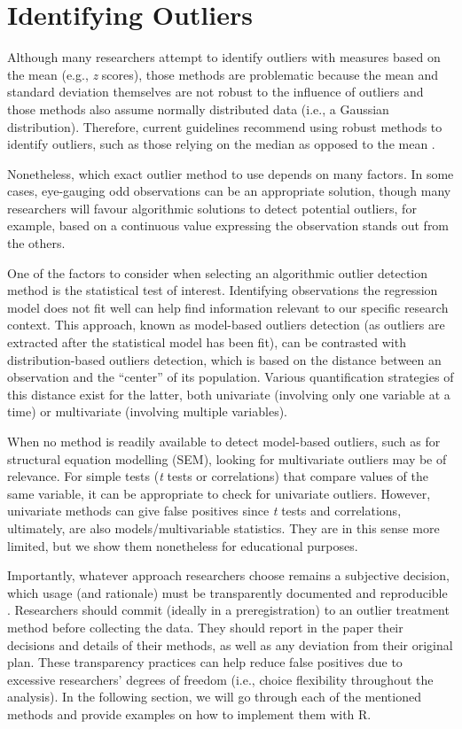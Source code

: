 \documentclass[sn-basic, lineno,pdflatex]{sn-jnl}
\begin{document}
\hypertarget{identifying-outliers}{%
\section{Identifying Outliers}\label{identifying-outliers}}

Although many researchers attempt to identify outliers with measures
based on the mean (e.g., \emph{z} scores), those methods are problematic
because the mean and standard deviation themselves are not robust to the
influence of outliers and those methods also assume normally distributed
data (i.e., a Gaussian distribution). Therefore, current guidelines
recommend using robust methods to identify outliers, such as those
relying on the median as opposed to the mean
\citep{leys2019outliers, leys2013outliers, leys2018outliers}.

Nonetheless, which exact outlier method to use depends on many factors.
In some cases, eye-gauging odd observations can be an appropriate
solution, though many researchers will favour algorithmic solutions to
detect potential outliers, for example, based on a continuous value
expressing the observation stands out from the others.

One of the factors to consider when selecting an algorithmic outlier
detection method is the statistical test of interest. Identifying
observations the regression model does not fit well can help find
information relevant to our specific research context. This approach,
known as model-based outliers detection (as outliers are extracted after
the statistical model has been fit), can be contrasted with
distribution-based outliers detection, which is based on the distance
between an observation and the ``center'' of its population. Various
quantification strategies of this distance exist for the latter, both
univariate (involving only one variable at a time) or multivariate
(involving multiple variables).

When no method is readily available to detect model-based outliers, such
as for structural equation modelling (SEM), looking for multivariate
outliers may be of relevance. For simple tests (\emph{t} tests or
correlations) that compare values of the same variable, it can be
appropriate to check for univariate outliers. However, univariate
methods can give false positives since \emph{t} tests and correlations,
ultimately, are also models/multivariable statistics. They are in this
sense more limited, but we show them nonetheless for educational
purposes.

Importantly, whatever approach researchers choose remains a subjective
decision, which usage (and rationale) must be transparently documented
and reproducible \citep{leys2019outliers}. Researchers should commit
(ideally in a preregistration) to an outlier treatment method before
collecting the data. They should report in the paper their decisions and
details of their methods, as well as any deviation from their original
plan. These transparency practices can help reduce false positives due
to excessive researchers' degrees of freedom (i.e., choice flexibility
throughout the analysis). In the following section, we will go through
each of the mentioned methods and provide examples on how to implement
them with R.
\end{document}
